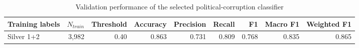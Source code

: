 \begin{table}[htbp]
\centering
\small
\caption{Validation performance of the selected political-corruption classifier}
\label{tab:pc-classifier-main}
\begin{tabular}{lrrrrrrrr}
\toprule
Training labels & $N_{train}$ & Threshold & Accuracy & Precision & Recall & F1 & Macro F1 & Weighted F1 \\
\midrule
Silver 1+2 & 3,982 & 0.40 & 0.863 & 0.731 & 0.809 & 0.768 & 0.835 & 0.865 \\
\bottomrule
\end{tabular}
\end{table}
